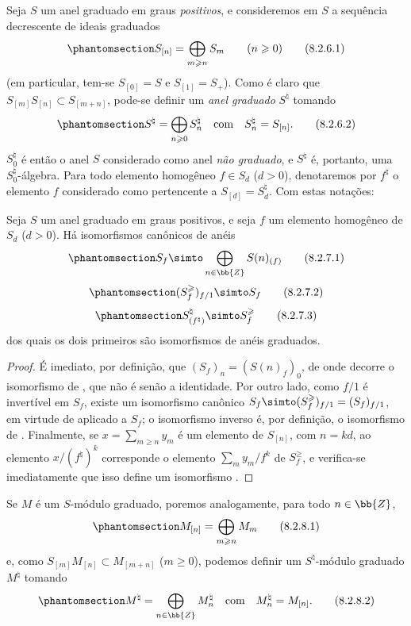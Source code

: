 \documentclass[oneside,10pt]{amsart}
\renewcommand{\geq}{\geqslant}
\newcommand{\oldpage}[2][]{\marginnote{\normalfont\footnotesize\textbf{#1}~|~#2}\ignorespaces}
\let\EGAOriginalLabel\label
\renewcommand{\label}[1]{\phantomsection\EGAOriginalLabel{#1}}
\begin{document}
\begin{env}[8.2.6]
\label{II.8.2.6}
Seja $S$ um anel graduado em graus \emph{positivos}, e consideremos em $S$ a sequência decrescente de ideais graduados
\[
\label{II.8.2.6.1}
  S_{[n]} = \bigoplus_{m\geq n} S_m
  \qquad\mbox{($n\geq0$)}
\tag{8.2.6.1}
\]
(em particular, tem-se $S_{[0]}=S$ e $S_{[1]}=S_+$).
Como é claro que $S_{[m]}S_{[n]}\subset S_{[m+n]}$, pode-se definir um \emph{anel graduado} $S^\natural$ tomando
\[
\label{II.8.2.6.2}
  S^\natural = \bigoplus_{n\geq0} S_n^\natural
  \quad
  \text{com}
  \quad
  S_n^\natural = S_{[n]}.
\tag{8.2.6.2}
\]
$S_0^\natural$ é então o anel $S$ considerado como anel \emph{não graduado}, e $S^\natural$ é, portanto, uma $S_0^\natural$-álgebra.
Para todo elemento homogêneo $f\in S_d$ ($d>0$), denotaremos por $f^\natural$ o elemento $f$ considerado como pertencente a $S_{[d]}=S_d^\natural$.
Com estas notações:
\end{env}

\oldpage[II]{159}
\begin{lemma}[8.2.7]
\label{II.8.2.7}
Seja $S$ um anel graduado em graus positivos, e seja $f$ um elemento homogêneo de $S_d$ ($d>0$).
Há isomorfismos canônicos de anéis
\[
\label{II.8.2.7.1}
  S_f \simto \bigoplus_{n\in\bb{Z}} S(n)_{(f)}
\tag{8.2.7.1}
\]
\[
\label{II.8.2.7.2}
  (S_f^\geq)_{f/1} \simto S_f
\tag{8.2.7.2}
\]
\[
\label{II.8.2.7.3}
  S_{(f^\natural)}^\natural \simto S_f^\geq
\tag{8.2.7.3}
\]
dos quais os dois primeiros são isomorfismos de anéis graduados.
\end{lemma}

\begin{proof}
É imediato, por definição, que $(S_f)_n=(S(n)_f)_0$, de onde decorre o isomorfismo de , que não é senão a identidade.
Por outro lado, como $f/1$ é invertível em $S_f$, existe um isomorfismo canônico $S_f\simto(S_f^\geq)_{f/1}=(S_f)_{f/1}$, em virtude de  aplicado a $S_f$;
o isomorfismo inverso é, por definição, o isomorfismo de .
Finalmente, se $x=\sum_{m\geq n}y_m$ é um elemento de $S_{[n]}$, com $n=kd$, ao elemento $x/(f^\natural)^k$ corresponde o elemento $\sum_m y_m/f^k$ de $S_f^\geq$, e verifica-se imediatamente que isso define um isomorfismo .
\end{proof}

\begin{env}[8.2.8]
\label{II.8.2.8}
Se $M$ é um $S$-módulo graduado, poremos analogamente, para todo $n\in\bb{Z}$,
\[
\label{II.8.2.8.1}
  M_{[n]} = \bigoplus_{m\geq n} M_m
\tag{8.2.8.1}
\]
e, como $S_{[m]}M_{[n]} \subset M_{[m+n]}$ ($m\geq0$), podemos definir um $S^\natural$-módulo graduado $M^\natural$ tomando
\[
\label{II.8.2.8.2}
  M^\natural = \bigoplus_{n\in\bb{Z}} M_n^\natural
  \quad
  \text{com}
  \quad
  M_n^\natural = M_{[n]}.
\tag{8.2.8.2}
\]
\end{env}
\end{document}
